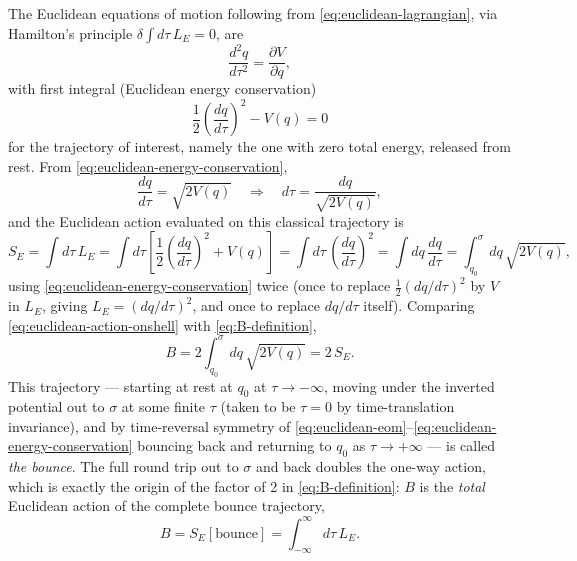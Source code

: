 The Euclidean equations of motion following from \eqref{eq:euclidean-lagrangian}, via Hamilton's principle $\delta\int d\tau\, L_E = 0$, are
\begin{equation}
\frac{d^2 q}{d\tau^2} = \frac{\partial V}{\partial q},
\label{eq:euclidean-eom}
\end{equation}
with first integral (Euclidean energy conservation)
\begin{equation}
\frac{1}{2}\left(\frac{dq}{d\tau}\right)^2 - V(q) = 0
\label{eq:euclidean-energy-conservation}
\end{equation}
for the trajectory of interest, namely the one with zero total energy, released from rest. From \eqref{eq:euclidean-energy-conservation},
\begin{equation}
\frac{dq}{d\tau} = \sqrt{2V(q)} \quad\Longrightarrow\quad d\tau = \frac{dq}{\sqrt{2V(q)}},
\label{eq:euclidean-velocity}
\end{equation}
and the Euclidean action evaluated on this classical trajectory is
\begin{equation}
S_E = \int d\tau\, L_E = \int d\tau\left[\frac{1}{2}\left(\frac{dq}{d\tau}\right)^2 + V(q)\right] = \int d\tau\, \left(\frac{dq}{d\tau}\right)^2 = \int dq\,\frac{dq}{d\tau} = \int_{q_0}^{\sigma} dq\,\sqrt{2V(q)},
\label{eq:euclidean-action-onshell}
\end{equation}
using \eqref{eq:euclidean-energy-conservation} twice (once to replace $\tfrac12(dq/d\tau)^2$ by $V$ in $L_E$, giving $L_E = (dq/d\tau)^2$, and once to replace $dq/d\tau$ itself). Comparing \eqref{eq:euclidean-action-onshell} with \eqref{eq:B-definition},
\begin{equation}
B = 2\int_{q_0}^{\sigma}dq\,\sqrt{2V(q)} = 2\,S_E.
\label{eq:B-equals-2SE}
\end{equation}
This trajectory --- starting at rest at $q_0$ at $\tau \to -\infty$, moving under the inverted potential out to $\sigma$ at some finite $\tau$ (taken to be $\tau=0$ by time-translation invariance), and by time-reversal symmetry of \eqref{eq:euclidean-eom}--\eqref{eq:euclidean-energy-conservation} bouncing back and returning to $q_0$ as $\tau\to+\infty$ --- is called \emph{the bounce}. The full round trip out to $\sigma$ and back doubles the one-way action, which is exactly the origin of the factor of 2 in \eqref{eq:B-definition}: $B$ is the \emph{total} Euclidean action of the complete bounce trajectory,
\begin{equation}
	B = S_E[\text{bounce}] = \int_{-\infty}^{\infty} d\tau\, L_E.
\label{eq:B-total-action}
\end{equation}


